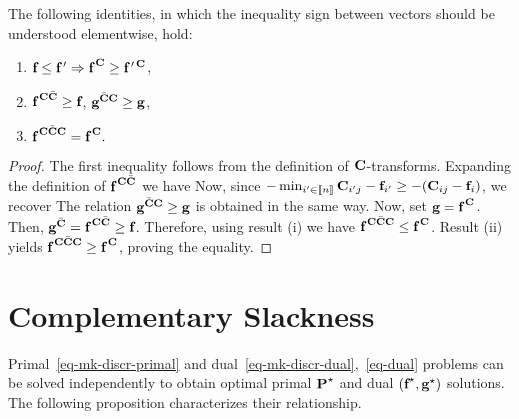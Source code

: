 \begin{prop}\label{prop-ccc-2}The following identities, in which the inequality sign between vectors should be understood elementwise, hold:
	\begin{enumerate}[label=(\roman*)]
	\item $\fD\leq \fD\,' \Rightarrow \fD^{\,\C}\geq \fD\,'^{\,\C}$, 
	\item $\fD^{\,\C\bar{\C}} \geq \fD$, $\gD^{\bar{\C}\C} \geq \gD$, 
	\item $\fD^{\,\C\bar{\C}\C}=\fD^{\,\C}.$
\end{enumerate}	
\end{prop}
\begin{proof} The first inequality follows from the definition of $\C$-transforms. Expanding the definition of $\fD^{\,\C\bar{\C}}$ we have
Now, since $-\min_{i'\in \range{n}} \C_{i'j}-\fD_{i'} \geq -(\C_{ij}-\fD_i)$, we recover 
The relation $\gD^{\bar{\C}\C} \geq \gD$ is obtained in the same way. Now, set $\gD=\fD^{\,\C}$. Then, $\gD^{\bar{\C}}=\fD^{\,\C\bar{\C}}\geq \fD$. Therefore, using result (i) we have $\fD^{\,\C\bar{\C}\C}\leq \fD^{\,\C}$. Result (ii) yields $\fD^{\,\C\bar{\C}\C}\geq \fD^{\,\C}$, proving the equality.
\end{proof}


\section{Complementary Slackness}\label{s-complementary}

Primal~\eqref{eq-mk-discr-primal} and dual~\eqref{eq-mk-discr-dual},~\eqref{eq-dual} problems can be solved independently to obtain optimal primal $\P^{\star}$ and dual $(\fD^{\star},\gD^{\star})$ solutions. The following proposition characterizes their relationship. 

